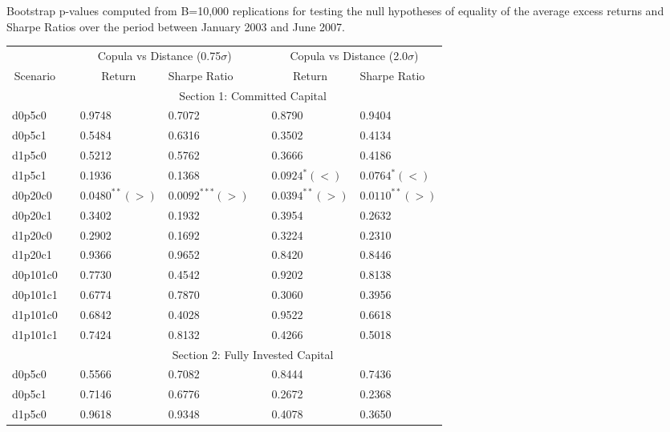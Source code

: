 \documentclass[a4paper]{article}
\begin{document}
\medskip

\begin{threeparttable}[H]
	\centering \scriptsize
	\caption{Bootstrap p-values computed from B=10,000 replications for testing the null hypotheses of equality of the average excess returns and Sharpe Ratios over the period between January 2003 and June 2007.}
	\begin{tabularx}{\textwidth}{@{\extracolsep{\fill}}lllllll@{}}
		\toprule
		& & \multicolumn{2}{c}{Copula vs Distance (0.75$\sigma$)} & \multicolumn{1}{c}{} & \multicolumn{2}{c}{Copula vs Distance (2.0$\sigma$)} \\
		\cmidrule{3-4}  \cmidrule{6-7}
		\multicolumn{1}{c}{Scenario} & & \multicolumn{1}{c}{Return} & Sharpe Ratio &       & \multicolumn{1}{c}{Return}& Sharpe Ratio \\
		\midrule
		& \multicolumn{6}{c}{Section 1: Committed Capital} \\
		\midrule
		d0p5c0 & & 0.9748 & 0.7072 &       & 0.8790 & 0.9404 \\
		d0p5c1 & & 0.5484 & 0.6316 &       & 0.3502 & 0.4134 \\
		d1p5c0 & & 0.5212 & 0.5762 &       & 0.3666 & 0.4186 \\
		d1p5c1 & & 0.1936 & 0.1368 &       & $0.0924^{*}(<)$ & $0.0764^{*}(<)$ \\
		d0p20c0 & & $0.0480^{**}(>)$ & $0.0092^{***}(>)$ &       & $0.0394^{**}(>)$ & $0.0110^{**}(>)$ \\
		d0p20c1 & & 0.3402 & 0.1932 &       & 0.3954 & 0.2632 \\
		d1p20c0 & & 0.2902 & 0.1692 &       & 0.3224 & 0.2310 \\
		d1p20c1 & & 0.9366 & 0.9652 &       & 0.8420 & 0.8446 \\
		d0p101c0 & & 0.7730 & 0.4542 &       & 0.9202 & 0.8138 \\
		d0p101c1 & & 0.6774 & 0.7870 &       & 0.3060 & 0.3956 \\
		d1p101c0 & & 0.6842 & 0.4028 &       & 0.9522 & 0.6618 \\
		d1p101c1 & & 0.7424 & 0.8132 &       & 0.4266 & 0.5018 \\
		\midrule
		& \multicolumn{6}{c}{Section 2:  Fully Invested Capital } \\
		\midrule
		d0p5c0 & & 0.5566 & 0.7082 &       & 0.8444 & 0.7436 \\
		d0p5c1 & & 0.7146 & 0.6776 &       & 0.2672 & 0.2368 \\
		d1p5c0 & & 0.9618 & 0.9348 &       & 0.4078 & 0.3650 \\

\end{tabularx}
\end{threeparttable}
\end{document}
